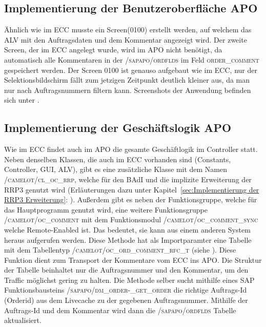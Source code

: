 \subsection{Implementierung der Benutzeroberfläche APO}
\label{sec:Implementierung der Benutzeroberfläche APO} 
Ähnlich wie im \ac{ECC} musste ein Screen(0100) erstellt werden, auf welchem das \ac{ALV} mit den Auftragsdaten und dem Kommentar angezeigt wird. Der zweite Screen, der im \ac{ECC} angelegt wurde, wird im \ac{APO} nicht benötigt, da automatisch alle Kommentaren in der \textsc{/sapapo/ordflds} im Feld \textsc{order\_comment} gespeichert werden. Der Screen 0100 ist genauso aufgebaut wie im \ac{ECC}, nur der Selektionsbildschirm fällt zum jetzigen Zeitpunkt deutlich kleiner aus, da man nur nach Auftragsnummern filtern kann. Screenshots der Anwendung befinden sich unter . 

\subsection{Implementierung der Geschäftslogik APO}
\label{sec:Implementierung der Geschäftslogik APO}  
Wie im \ac{ECC} findet auch im \ac{APO} die gesamte Geschäftlogik im Controller statt. Neben denselben Klassen, die auch im \ac{ECC} vorhanden sind (Constants, Controller, \ac{GUI}, \ac{ALV}), gibt es eine zusätzliche Klasse mit dem Namen \textsc{/camelot/cl\_oc\_rrp}, welche für den \ac{BAdI} und die implizite Erweiterung der RRP3 genutzt wird (Erläuterungen dazu unter Kapitel~\ref{sec:Implementierung der RRP3 Erweiterung}: ). Außerdem gibt es neben der Funktionsgruppe, welche für das Hauptprogramm genutzt wird, eine weitere Funktionsgruppe \textsc{/camelot/oc\_comment} mit dem Funktionsmodul \textsc{/camelot/oc\_comment\_sync} welche Remote-Enabled ist. Das bedeutet, sie kann aus einem anderen System heraus aufgerufen werden. Diese Methode hat als Importparamter eine Tabelle mit dem Tabellentyp \textsc{/camelot/oc\_ord\_comment\_rfc\_t} (siehe ). Diese Funktion dient zum Transport der Kommentare vom \ac{ECC} ins \ac{APO}. Die Struktur der Tabelle beinhaltet nur die Auftragsnummer und den Kommentar, um den Traffic möglichst gering zu halten. Die Methode selber sucht mithilfe eines SAP Funktionsbausteins \textsc{/sapapo/dm\_order-\_get\_order} die richtige Auftrags-Id (Orderid) aus dem Livecache zu der gegebenen Auftragsnummer. Mithilfe der Auftrags-Id und dem Kommentar wird dann die \textsc{/sapapo/ordflds} Tabelle aktualisiert.  

